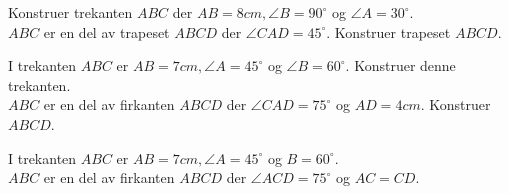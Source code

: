 \documentclass[12pt]{exam}
\begin{document}
\begin{questions}
\question
Konstruer trekanten $ABC$ der $AB = 8cm,\angle B = 90^{\circ}$ og $\angle A = 30^{\circ}$.\\
$ABC$ er en del av trapeset $ABCD$ der $\angle CAD = 45^{\circ}$. Konstruer trapeset $ABCD$.

\question
I trekanten $ABC$ er $AB = 7cm, \angle A = 45^{\circ}$ og $\angle B = 60^{\circ}$. Konstruer denne trekanten.\\
$ABC$ er en del av firkanten $ABCD$ der $\angle CAD = 75^{\circ}$ og $AD = 4cm$. Konstruer $ABCD$.

\question
{}

\question
I trekanten $ABC$ er $AB=7cm, \angle A=45^{\circ}$ og $B = 60^{\circ}$.\\
$ABC$ er  en del av firkanten $ABCD$ der $\angle ACD = 75^{\circ}$ og $AC=CD$.
\question
{}
\end{questions}
\end{document}
